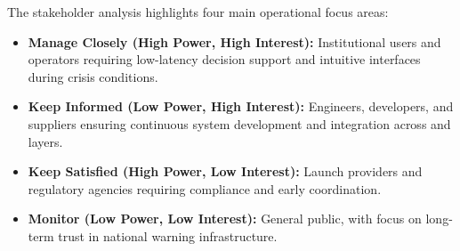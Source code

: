 The stakeholder analysis highlights four main operational focus areas:

\begin{itemize}
    \item \textbf{Manage Closely (High Power, High Interest):} Institutional users and operators requiring low-latency decision support and intuitive interfaces during crisis conditions.
    
    \item \textbf{Keep Informed (Low Power, High Interest):} Engineers, developers, and suppliers ensuring continuous system development and integration across  and  layers.
    
    \item \textbf{Keep Satisfied (High Power, Low Interest):} Launch providers and regulatory agencies requiring compliance and early coordination.
    
    \item \textbf{Monitor (Low Power, Low Interest):} General public, with focus on long-term trust in national warning infrastructure.
\end{itemize}